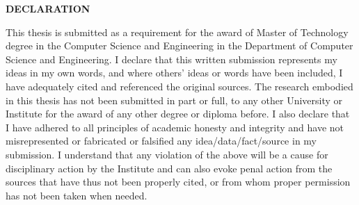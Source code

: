 
\newpage
\thispagestyle{empty}
\cleardoublepage

\thispagestyle{plain}
\begin{center}
\textbf{\large DECLARATION}
\end{center}


This thesis is submitted as a requirement for the award of Master of Technology degree in the Computer Science and Engineering in the Department of Computer Science and Engineering. I declare that this
written submission represents my ideas in my own words, and where others' ideas or
words have been included, I have adequately cited and referenced the original sources.
The research embodied in this thesis has not been submitted in part or full, to any other
University or Institute for the award of any other degree or diploma before. I also declare
that I have adhered to all principles of academic honesty and integrity and have
not misrepresented or fabricated or falsified any idea/data/fact/source in my submission.
I understand that any violation of the above will be a cause for disciplinary action by
the Institute and can also evoke penal action from the sources that have thus not been
properly cited, or from whom proper permission has not been taken when needed.


